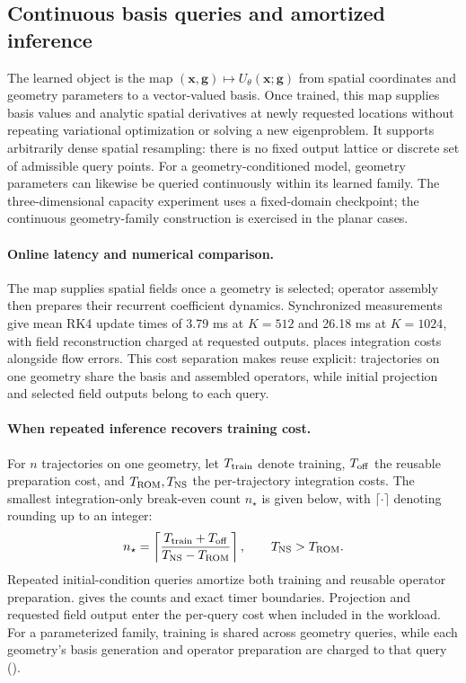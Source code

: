 \subsection{Continuous basis queries and amortized inference}
\label{sec:inference-cost}
The learned object is the map $(\mathbf x,\mathbf g)\mapsto U_\theta(\mathbf x;\mathbf g)$ from spatial coordinates and geometry parameters to a vector-valued basis. Once trained, this map supplies basis values and analytic spatial derivatives at newly requested locations without repeating variational optimization or solving a new eigenproblem. It supports arbitrarily dense spatial resampling: there is no fixed output lattice or discrete set of admissible query points. For a geometry-conditioned model, geometry parameters can likewise be queried continuously within its learned family. The three-dimensional capacity experiment uses a fixed-domain checkpoint; the continuous geometry-family construction is exercised in the planar cases.

\paragraph{Online latency and numerical comparison.}
\begingroup
The map supplies spatial fields once a geometry is selected; operator assembly then prepares their recurrent coefficient dynamics. Synchronized measurements give mean RK4 update times of 3.79 ms at $K=512$ and 26.18 ms at $K=1024$, with field reconstruction charged at requested outputs.  places integration costs alongside flow errors. This cost separation makes reuse explicit: trajectories on one geometry share the basis and assembled operators, while initial projection and selected field outputs belong to each query.
\par\endgroup

\paragraph{When repeated inference recovers training cost.}
For $n$ trajectories on one geometry, let $T_{\rm train}$ denote training, $T_{\rm off}$ the reusable preparation cost, and $T_{\rm ROM},T_{\rm NS}$ the per-trajectory integration costs. The smallest integration-only break-even count $n_\star$ is given below, with $\lceil\cdot\rceil$ denoting rounding up to an integer:
\begin{equation}
n_\star=\left\lceil\frac{T_{\rm train}+T_{\rm off}}{T_{\rm NS}-T_{\rm ROM}}\right\rceil,
\qquad T_{\rm NS}>T_{\rm ROM}.
\label{eq:inference-break-even}
\end{equation}
{Repeated initial-condition queries amortize both training and reusable operator preparation.  gives the counts and exact timer boundaries. Projection and requested field output enter the per-query cost when included in the workload. For a parameterized family, training is shared across geometry queries, while each geometry's basis generation and operator preparation are charged to that query ().}
